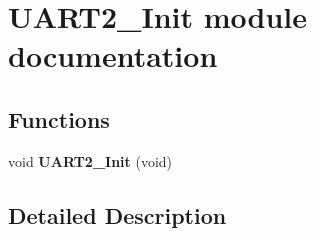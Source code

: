 \hypertarget{group___u_a_r_t2___init__module}{}\section{U\+A\+R\+T2\+\_\+\+Init module documentation}
\label{group___u_a_r_t2___init__module}
\subsection*{Functions}
\begin{DoxyCompactItemize}
\item 
void {\bfseries U\+A\+R\+T2\+\_\+\+Init} (void)\hypertarget{group___u_a_r_t2___init__module_gaebe7f80bf3ea5b3087c68663a0da35ed}{}\label{group___u_a_r_t2___init__module_gaebe7f80bf3ea5b3087c68663a0da35ed}

\end{DoxyCompactItemize}


\subsection{Detailed Description}
